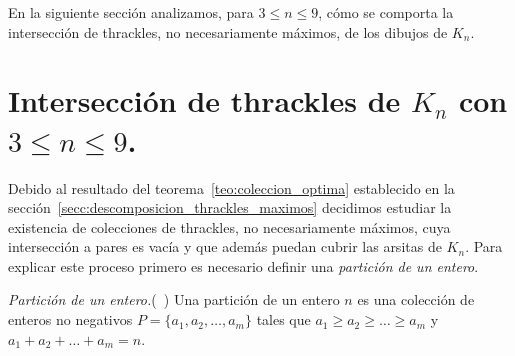   En la siguiente sección analizamos, para $ 3\leq n\leq 9$, cómo
  se comporta la intersección de thrackles, no necesariamente máximos, de los
  dibujos de $K_n$.


  \section{Intersección de thrackles de $K_n$ con $3\leq n \leq 9$.}

    Debido al resultado del teorema~\ref{teo:coleccion_optima} establecido
    en la sección~\ref{secc:descomposicion_thrackles_maximos} decidimos estudiar
    la existencia de colecciones de thrackles, no necesariamente máximos,
    cuya intersección a pares es vacía y que además puedan cubrir las arsitas
    de $K_n$. Para explicar este proceso primero es necesario definir una
    \emph{partición de un entero}.

    \begin{definition}{\emph{Partición de un entero.}(~\cite{Knuth2011})}
      Una partición de un entero $n$ es una colección de enteros
      no negativos $P = \{a_1, a_2, \dots, a_m\}$ tales que
      $a_1 \geq a_2\geq \dots \geq a_m$ y $a_1 + a_2 + \dots + a_m = n$.
    \end{definition}


